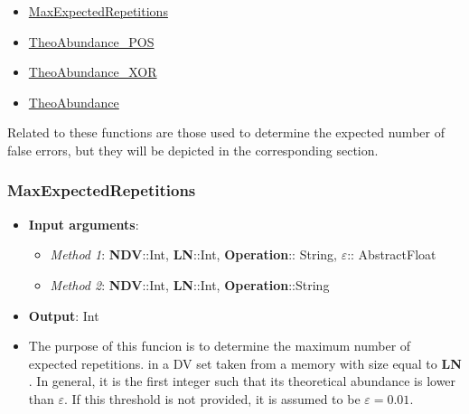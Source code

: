 \begin{itemize}
	\item \hyperref[Subsec:MaxExpectedRepetitions]{MaxExpectedRepetitions}
	\item \hyperref[Subsec:TheoAbundance_POS]{TheoAbundance\_POS}
	\item \hyperref[Subsec:TheoAbundance_XOR]{TheoAbundance\_XOR}
	\item \hyperref[Subsec:TheoAbundance]{TheoAbundance}
\end{itemize}

Related to these functions are those used to determine the expected number of false errors, but they will be depicted in the corresponding section.
%
\subsubsection*{MaxExpectedRepetitions}\label{Subsec:MaxExpectedRepetitions}
%
\begin{itemize}
	\item \textbf{Input arguments}: 
	\begin{itemize}
		\item \textit{Method 1}: \textbf{NDV}::Int, \textbf{LN}::Int, \textbf{Operation}:: String, \(\varepsilon\):: AbstractFloat	
		\item \textit{Method 2}: \textbf{NDV}::Int, \textbf{LN}::Int, \textbf{Operation}::String
	\end{itemize}
	\item \textbf{Output}: Int
	\item The purpose of this funcion is to determine the maximum number of expected
	repetitions. in a DV set taken from a memory with size equal to \textbf{LN} .
	In general, it is the first integer such that its theoretical abundance is
	lower than \(\varepsilon\). If this threshold is not provided, it is assumed to be \(\varepsilon = 0.01\).
\end{itemize}
%
